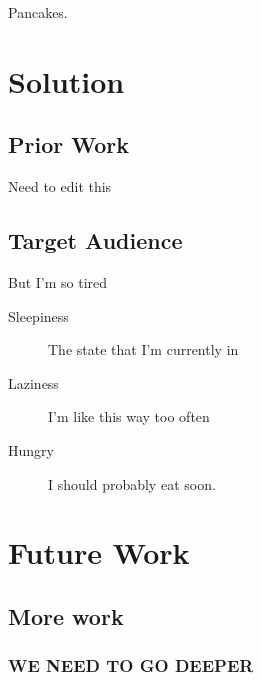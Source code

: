\documentclass{acm_proc_article-sp}
\begin{document}
    Pancakes.
	
\section{Solution}

\subsection{Prior Work}

Need to edit this
	
\subsection{Target Audience}
	
But I'm so tired 

\begin{description}
	\item[Sleepiness] The state that I'm currently in
	\item[Laziness] I'm like this way too often
	\item[Hungry] I should probably eat soon.
\end{description}

	
	


\section{Future Work}

    \subsection{More work}
    
    \subsubsection{WE NEED TO GO DEEPER}
\end{document}
